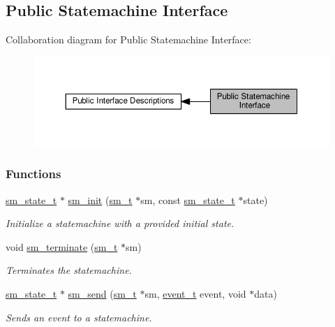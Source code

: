 \hypertarget{group___sm_interface}{}\subsection{Public Statemachine Interface}
\label{group___sm_interface}
Collaboration diagram for Public Statemachine Interface\+:\nopagebreak
\begin{figure}[H]
\begin{center}
\leavevmode
\includegraphics[width=350pt]{group___sm_interface}
\end{center}
\end{figure}
\subsubsection*{Functions}
\begin{DoxyCompactItemize}
\item 
\hyperlink{structsm__state__t}{sm\+\_\+state\+\_\+t} $\ast$ \hyperlink{group___sm_interface_ga4d433df4f0fbd1033d3815ad870cdc5f}{sm\+\_\+init} (\hyperlink{structsm__t}{sm\+\_\+t} $\ast$sm, const \hyperlink{structsm__state__t}{sm\+\_\+state\+\_\+t} $\ast$state)
\begin{DoxyCompactList}\small\item\em Initialize a statemachine with a provided initial state. \end{DoxyCompactList}\item 
void \hyperlink{group___sm_interface_ga4a0ade9dfadc3d8a476cd64934ee369c}{sm\+\_\+terminate} (\hyperlink{structsm__t}{sm\+\_\+t} $\ast$sm)
\begin{DoxyCompactList}\small\item\em Terminates the statemachine. \end{DoxyCompactList}\item 
\hyperlink{structsm__state__t}{sm\+\_\+state\+\_\+t} $\ast$ \hyperlink{group___sm_interface_gac4c2466939ae8d63448dc84848abb7fe}{sm\+\_\+send} (\hyperlink{structsm__t}{sm\+\_\+t} $\ast$sm, \hyperlink{sm_8h_a1db78734760bf970c329945446b28432}{event\+\_\+t} event, void $\ast$data)
\begin{DoxyCompactList}\small\item\em Sends an event to a statemachine. \end{DoxyCompactList}\end{DoxyCompactItemize}


